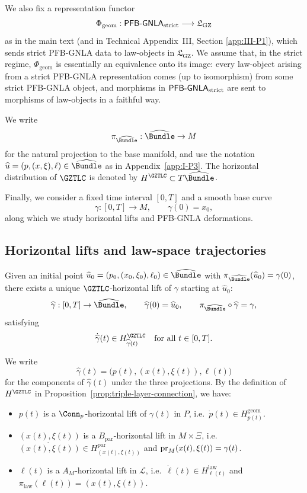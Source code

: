 \documentclass[11pt]{book}
\theoremstyle{plain}
\theoremstyle{definition}
\newcommand{\GZLS}{\ensuremath{\mathfrak{L}_{\mathrm{GZ}}}}       \newcommand{\GZLT}{\ensuremath{M_{!w}}}                           \newcommand{\GZLOC}{\ensuremath{A_M}}                             \newcommand{\GZLCurv}{\ensuremath{\mathcal{F}_{\mathrm{law}}}}
\begin{document}
We also fix a representation functor
\[
  \Phi_{\mathrm{geom}} :
  \mathsf{PFB\text- GNLA}_{\mathrm{strict}}
  \longrightarrow
  \GZLS
\]
as in the main text (and in Technical Appendix~III, Section
\ref{app:III-P1}), which sends strict PFB-GNLA data to law-objects in
\(\GZLS\).  We assume that, in the strict regime, \(\Phi_{\mathrm{geom}}\)
is essentially an equivalence onto its image: every law-object
arising from a strict PFB-GNLA representation comes (up to isomorphism)
from some strict PFB-GNLA object, and morphisms in
\(\mathsf{PFB\text- GNLA}_{\mathrm{strict}}\) are sent to morphisms of
law-objects in a faithful way.



We write
\[
  \pi_{\widehat{\Bundle}}:\widehat{\Bundle}\to M
\]
for the natural projection to the base manifold, and use the notation
\(\widehat{u}=(p,(x,\xi),\ell)\in\widehat{\Bundle}\) as in
Appendix~\ref{app:I-P3}.  The horizontal distribution of \(\GZTLC\) is
denoted by \(H^{\GZTLC}\subset T\widehat{\Bundle}\).

Finally, we consider a fixed time interval \([0,T]\) and a smooth base
curve
\[
  \gamma:[0,T]\to M,
  \qquad \gamma(0)=x_0,
\]
along which we study horizontal lifts and PFB-GNLA deformations.



\subsection*{Horizontal lifts and law-space trajectories}


Given an initial point
\(\widehat{u}_0=(p_0,(x_0,\xi_0),\ell_0)\in\widehat{\Bundle}\) with
\(\pi_{\widehat{\Bundle}}(\widehat{u}_0)=\gamma(0)\), there exists a
unique \(\GZTLC\)-horizontal lift of \(\gamma\) starting at
\(\widehat{u}_0\):
\[
  \widehat{\gamma}:[0,T]\to\widehat{\Bundle},\qquad
  \widehat{\gamma}(0)=\widehat{u}_0,\qquad
  \pi_{\widehat{\Bundle}}\circ\widehat{\gamma}=\gamma,
\]
satisfying
\[
  \dot{\widehat{\gamma}}(t)\in
  H^{\GZTLC}_{\widehat{\gamma}(t)}
  \quad\text{for all } t\in[0,T].
\]

We write
\[
  \widehat{\gamma}(t)
  =
  \bigl(p(t),(x(t),\xi(t)),\ell(t)\bigr)
\]
for the components of \(\widehat{\gamma}(t)\) under the three
projections.  By the definition of \(H^{\GZTLC}\) in
Proposition~\ref{prop:triple-layer-connection}, we have:

\begin{itemize}
  \item \(p(t)\) is a \(\Conn_p\)-horizontal lift of \(\gamma(t)\) in
        \(P\), i.e.\ \(\dot{p}(t)\in H^{\mathrm{geom}}_{p(t)}\).
  \item \((x(t),\xi(t))\) is a \(B_{\mathrm{par}}\)-horizontal lift in
        \(M\times\Xi\), i.e.\ \(\dot{(x(t),\xi(t))}\in
        H^{\mathrm{par}}_{(x(t),\xi(t))}\) and
        \(\mathrm{pr}_M(x(t),\\ \xi(t))=\gamma(t)\).
  \item \(\ell(t)\) is a \(\GZLOC\)-horizontal lift in \(\mathcal{L}\),
        i.e.\ \(\dot{\ell}(t)\in H^{\mathrm{law}}_{\ell(t)}\) and
        \(\pi_{\mathrm{law}}(\ell(t))=(x(t),\xi(t))\).
\end{itemize}
\end{document}
